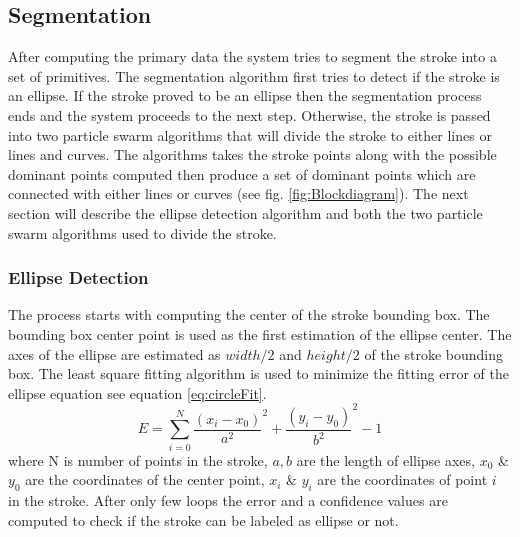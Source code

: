 \documentclass[a4paper,10pt]{IEEEconf}
\begin{document}
\subsection{Segmentation}
\label{seg}
After computing the primary data the system tries to segment the stroke into a set of primitives. The segmentation algorithm first tries to detect if the stroke is an ellipse. If the stroke proved to be an ellipse then the segmentation process ends and the system proceeds to the next step. Otherwise, the stroke is passed into two particle swarm algorithms that will divide the stroke to either lines or lines and curves. The algorithms takes the stroke points along with the possible dominant points computed then produce a set of dominant points which are connected with either lines or curves (see fig. \ref{fig:Blockdiagram}). The next section will describe the ellipse detection algorithm and both the two particle swarm algorithms used to divide the stroke.\\
\subsubsection{Ellipse Detection} 
The process starts with computing the center of the stroke bounding box. The bounding box center point is used as the first estimation of the ellipse center. The axes of the ellipse are estimated as $width/2$ and $height/2$ of the stroke bounding box. The least square fitting algorithm is used to minimize the fitting error of the ellipse equation see equation \ref{eq:circleFit}.
\begin{equation}
E = \sum\limits_{i = 0}^N {\frac{{(x_i - x_0 )}}{{a^2 }}^2  + \frac{{(y_i - y_0 )}}{{b^2 }}^2  - 1} 
\label{eq:circleFit}
\end{equation} where N is number of points in the stroke, $a,b$ are the length of ellipse axes, $x_0$ \& $y_0$ are the coordinates of the center point, $x_i$ \& $y_i$ are the coordinates of point $i$ in the stroke. After only few loops the error and a confidence values  are computed to check if the stroke can be labeled as ellipse or not.\\ %
\end{document}
